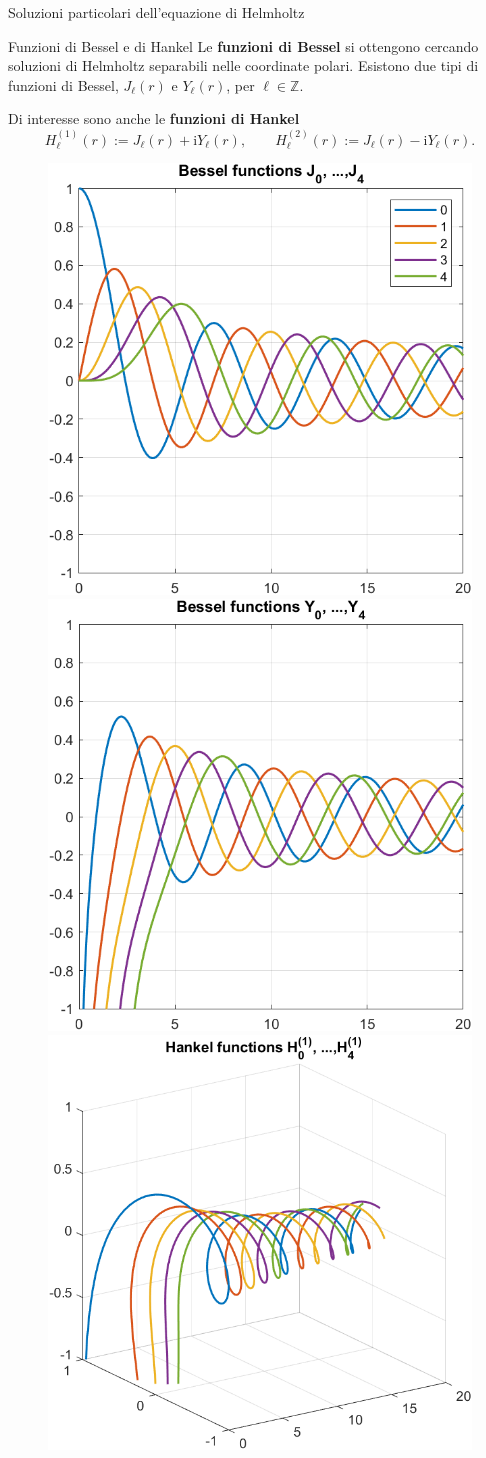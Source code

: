 \documentclass{beamer}
\newcommand{\IZ}{{\mathbb Z}}
\newcommand{\ri}{{\mathrm i}}
\begin{document}
	\begin{frame}{Soluzioni particolari dell'equazione di Helmholtz}
		\begin{small}	
		\begin{block}{Funzioni di Bessel e di Hankel}	
			Le \textbf{funzioni di Bessel} si ottengono cercando soluzioni di Helmholtz separabili nelle coordinate polari.  Esistono due tipi di funzioni di Bessel, $J_\ell(r)$ e $Y_\ell(r)$, per $\ell \in \IZ$.
			
			Di interesse sono anche le \textbf{funzioni di Hankel}
			\begin{equation*}
				H^{(1)}_\ell(r) := J_\ell(r) + \ri Y_\ell(r), \qquad H^{(2)}_\ell(r) := J_\ell(r) - \ri Y_\ell(r).
			\end{equation*}
		\end{block}
		\begin{figure}
			\includegraphics[width=.3\textwidth]{figs/besselj.png}\hfil\includegraphics[width=.3\textwidth]{figs/bessely.png}\hfil\includegraphics[width=.3\textwidth]{figs/hankel.png}
		\end{figure}
		\end{small}
	\end{frame}
	
\end{document}
